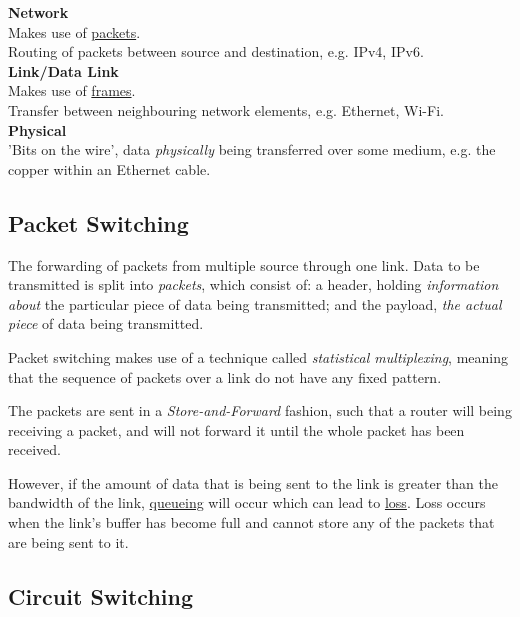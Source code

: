 \documentclass{article}
\begin{document}
{{    \textbf{Network}\\
    
    Makes use of \underline{packets}.\\

    Routing of packets between source and destination, e.g. IPv4, IPv6.\\
    
    \textbf{Link/Data Link}\\

    Makes use of \underline{frames}.\\

    Transfer between neighbouring network elements, e.g. Ethernet, Wi-Fi.\\

    \textbf{Physical}\\

    'Bits on the wire', data \textit{physically} being transferred over some medium, e.g. the copper within an Ethernet cable.\\

    }
}

\subsection{Packet Switching}

The forwarding of packets from multiple source through one link. Data to be transmitted is split into \textit{packets}, which consist of: a header, holding \textit{information about} the particular piece of data being transmitted; and the payload, \textit{the actual piece} of data being transmitted.

Packet switching makes use of a technique called \textit{statistical multiplexing}, meaning that the sequence of packets over a link do not have any fixed pattern.

The packets are sent in a \textit{Store-and-Forward} fashion, such that a router will being receiving a packet, and will not forward it until the whole packet has been received. 

However, if the amount of data that is being sent to the link is greater than the bandwidth of the link, \underline{queueing} will occur which can lead to \underline{loss}. Loss occurs when the link's buffer has become full and cannot store any of the packets that are being sent to it.

\subsection{Circuit Switching}
\end{document}
